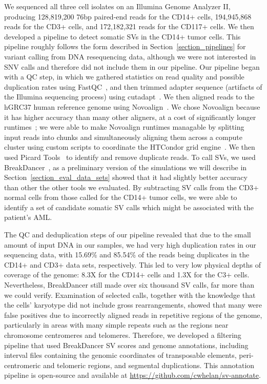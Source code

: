 We sequenced all three cell isolates on an Illumina Genome Analyzer II, producing 128,819,200 76bp paired-end reads for the CD14+ cells, 194,945,868 reads for the CD3+ cells, and 172,182,321 reads for the CD117+ cells. We then developed a pipeline to detect somatic SVs in the CD14+ tumor cells. This pipeline roughly follows the form described in Section~\ref{section_pipelines} for variant calling from DNA resequencing data, although we were not interested in SNV calls and therefore did not include them in our pipeline. Our pipeline began with a QC step, in which we gathered statistics on read quality and possible duplication rates using FastQC~\cite{fastqc}, and then trimmed adapter sequence (artifacts of the Illumina sequencing process) using cutadapt~\cite{Martin2011Cutadapt}. We then aligned reads to the hGRC37 human reference genome using Novoalign~\cite{novoalign}. We chose Novoalign because it has higher accuracy than many other aligners, at a cost of significantly longer runtimes~\cite{Ruffalo:2011p1758}; we were able to make Novoalign runtimes managable by splitting input reads into chunks and simultaneously aligning them across a compute cluster using custom scripts to coordinate the HTCondor grid engine~\cite{condor-practice}. We then used Picard Tools~\cite{picard} to identify and remove duplicate reads. To call SVs, we used BreakDancer~\cite{Chen:2009p3}, as a preliminary version of the simulations we will describe in Section~\ref{section_eval_data_sets} showed that it had slightly better accuracy than other the other tools we evaluated. By subtracting SV calls from the CD3+ normal cells from those called for the CD14+ tumor cells, we were able to identify a set of candidate somatic SV calls which might be associated with the patient's AML.

The QC and deduplication steps of our pipeline revealed that due to the small amount of input DNA in our samples, we had very high duplication rates in our sequencing data, with 15.69\% and 85.54\% of the reads being duplicates in the CD14+ and CD3+ data sets, respectively. This led to very low physical depths of coverage of the genome: 8.3X for the CD14+ cells and 1.3X for the C3+ cells. Nevertheless, BreakDancer still made over six thousand SV calls, far more than we could verify. Examination of selected calls, together with the knowledge that the cells' karyotype did not include gross rearrangements, showed that many were false positives due to incorrectly aligned reads in repetitive regions of the genome, particularly in areas with many simple repeats such as the regions near chromosome centromeres and telomeres. Therefore, we developed a filtering pipeline that used BreakDancer SV scores and genome annotations, including interval files containing the genomic coordinates of transposable elements, peri-centromeric and telomeric regions, and segmental duplications. This annotation pipeline is open-source and available at \url{https://github.com/cwhelan/sv-annotate}. 

